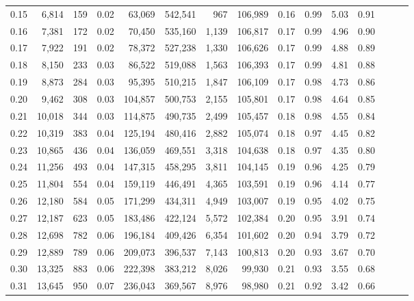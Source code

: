 \begin{tabular}{rrrrrrrrrrrrrrr}
0.15 &   6,814 &    159 &  0.02 &   63,069 &  542,541 &      967 &  106,989 &  0.16 &  0.99 &  5.03 &      0.91 \\
0.16 &   7,381 &    172 &  0.02 &   70,450 &  535,160 &    1,139 &  106,817 &  0.17 &  0.99 &  4.96 &      0.90 \\
0.17 &   7,922 &    191 &  0.02 &   78,372 &  527,238 &    1,330 &  106,626 &  0.17 &  0.99 &  4.88 &      0.89 \\
0.18 &   8,150 &    233 &  0.03 &   86,522 &  519,088 &    1,563 &  106,393 &  0.17 &  0.99 &  4.81 &      0.88 \\
0.19 &   8,873 &    284 &  0.03 &   95,395 &  510,215 &    1,847 &  106,109 &  0.17 &  0.98 &  4.73 &      0.86 \\
0.20 &   9,462 &    308 &  0.03 &  104,857 &  500,753 &    2,155 &  105,801 &  0.17 &  0.98 &  4.64 &      0.85 \\
0.21 &  10,018 &    344 &  0.03 &  114,875 &  490,735 &    2,499 &  105,457 &  0.18 &  0.98 &  4.55 &      0.84 \\
0.22 &  10,319 &    383 &  0.04 &  125,194 &  480,416 &    2,882 &  105,074 &  0.18 &  0.97 &  4.45 &      0.82 \\
0.23 &  10,865 &    436 &  0.04 &  136,059 &  469,551 &    3,318 &  104,638 &  0.18 &  0.97 &  4.35 &      0.80 \\
0.24 &  11,256 &    493 &  0.04 &  147,315 &  458,295 &    3,811 &  104,145 &  0.19 &  0.96 &  4.25 &      0.79 \\
0.25 &  11,804 &    554 &  0.04 &  159,119 &  446,491 &    4,365 &  103,591 &  0.19 &  0.96 &  4.14 &      0.77 \\
0.26 &  12,180 &    584 &  0.05 &  171,299 &  434,311 &    4,949 &  103,007 &  0.19 &  0.95 &  4.02 &      0.75 \\
0.27 &  12,187 &    623 &  0.05 &  183,486 &  422,124 &    5,572 &  102,384 &  0.20 &  0.95 &  3.91 &      0.74 \\
0.28 &  12,698 &    782 &  0.06 &  196,184 &  409,426 &    6,354 &  101,602 &  0.20 &  0.94 &  3.79 &      0.72 \\
0.29 &  12,889 &    789 &  0.06 &  209,073 &  396,537 &    7,143 &  100,813 &  0.20 &  0.93 &  3.67 &      0.70 \\
0.30 &  13,325 &    883 &  0.06 &  222,398 &  383,212 &    8,026 &   99,930 &  0.21 &  0.93 &  3.55 &      0.68 \\
0.31 &  13,645 &    950 &  0.07 &  236,043 &  369,567 &    8,976 &   98,980 &  0.21 &  0.92 &  3.42 &      0.66 \\

\end{tabular}
